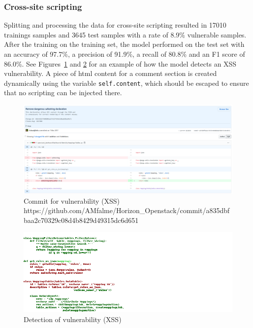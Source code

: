 \documentclass[
a4paper,
pagesize,
pdftex,
12pt,
ngerman,
fleqn,
final,
]{scrartcl}
\begin{document}
	\newpage
	
	\subsubsection{Cross-site scripting}
	Splitting and processing the data for cross-site scripting resulted in 17010 trainings samples and 3645 test samples with a rate of 8.9\% vulnerable samples. After the training on the training set, the model performed on the test set with an accuracy of 97.7\%, a precision of 91.9\%, a recall of 80.8\% and an F1 score of 86.0\%. See Figures~\ref{fig:xssA} and \ref{fig:xssAr} for an example of how the model detects an XSS vulnerability. A piece of html content for a comment section is created dynamically using the variable \texttt{self.content}, which should be escaped to ensure that no scripting can be injected there.
	
	\begin{figure}[H]
		\centering
		\includegraphics[width=\linewidth]{Images/xssA}
		\caption{Commit for vulnerability (XSS) \newline \scriptsize{https://github.com/AMfalme/Horizon\_Openstack/commit/a835dbfbaa2c70329c08d4b8429d49315dc6d651}}
		\label{fig:xssA}
	\end{figure}
	\begin{figure}[H]
		\centering
		\includegraphics[width=\linewidth]{Images/xssAr}
		\caption{Detection of vulnerability (XSS)}
		\label{fig:xssAr}
	\end{figure}
	
\end{document}
